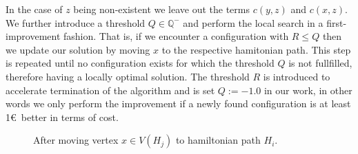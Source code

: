 In the case of $z$ being non-existent we leave out the terms $c(y,z)$ and $c(x,z)$. We further introduce a threshold $Q\in\mathbb{Q}^{-}$ and perform the local search in a first-improvement fashion. That is, if we encounter a configuration with $R \leq Q$ then we update our solution by moving $x$ to the respective hamitonian path.
This step is repeated until no configuration exists for which the threshold $Q$ is not fullfilled, therefore having a locally optimal solution. The threshold $R$ is introduced to accelerate termination of the algorithm and is set $Q:=-1.0$ in our work, in other words we only perform the improvement if a newly found configuration is at least 1\euro\ better in terms of cost.
\begin{figure}[H]
\centering
{}
\caption{After moving vertex $x\in V(H_j)$ to hamiltonian path $H_i$.}
\label{fig:hamiltonian_path_local_search_end}
\end{figure}